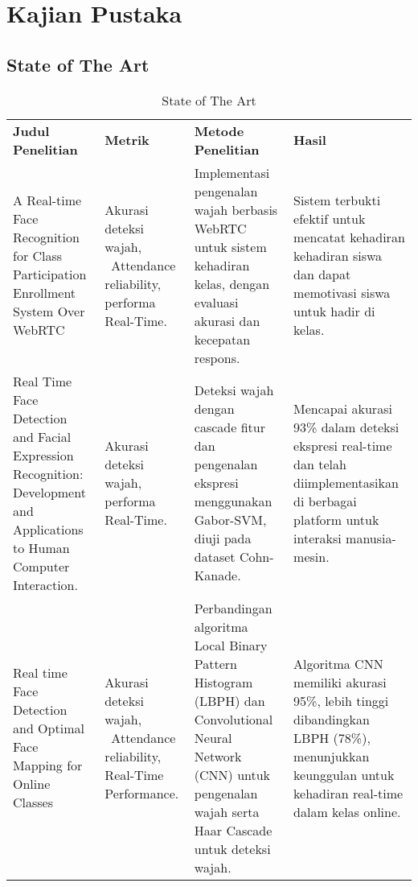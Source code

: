 \chapter{Kajian Pustaka}

\section{State of The Art}

\vspace{-1cm}
\begin{longtable}[t]
  {@{}
    |>{\raggedright\arraybackslash}p{}
    |>{\raggedright\arraybackslash}p{}
    |>{\raggedright\arraybackslash}p{}
    |>{\raggedright\arraybackslash}p{}|
  @{}}
  \endhead
  \endlastfoot

  \caption{State of The Art} \\

  \hline
  \textbf{Judul Penelitian} &
  \textbf{Metrik} &
  \textbf{Metode Penelitian} &
  \textbf{Hasil}

  \\ \hline
  {A Real-time Face Recognition for Class Participation Enrollment System Over WebRTC} &
  {Akurasi deteksi wajah, ~Attendance reliability, performa Real-Time.} &
  {Implementasi pengenalan wajah berbasis WebRTC untuk sistem kehadiran kelas, dengan evaluasi akurasi dan kecepatan respons.} &
  {Sistem terbukti efektif untuk mencatat kehadiran kehadiran siswa dan dapat memotivasi siswa untuk hadir di kelas.}

  \\ \hline
  {Real Time Face Detection and Facial Expression Recognition: Development and Applications to Human Computer Interaction.} &
  {Akurasi deteksi wajah, performa Real-Time.} &
  {Deteksi wajah dengan cascade fitur dan pengenalan ekspresi menggunakan Gabor-SVM, diuji pada dataset Cohn-Kanade.} &
  {Mencapai akurasi 93\% dalam deteksi ekspresi real-time dan telah diimplementasikan di berbagai platform untuk interaksi manusia-mesin.}

  \\ \hline
  {Real time Face Detection and Optimal Face Mapping for Online Classes} &
  {Akurasi deteksi wajah, ~Attendance reliability, Real-Time Performance.} &
  {Perbandingan algoritma Local Binary Pattern Histogram (LBPH) dan Convolutional Neural Network (CNN) untuk pengenalan wajah serta Haar Cascade untuk deteksi wajah.} &
  {Algoritma CNN memiliki akurasi 95\%, lebih tinggi dibandingkan LBPH (78\%), menunjukkan keunggulan untuk kehadiran real-time dalam kelas online.}


\end{longtable}
